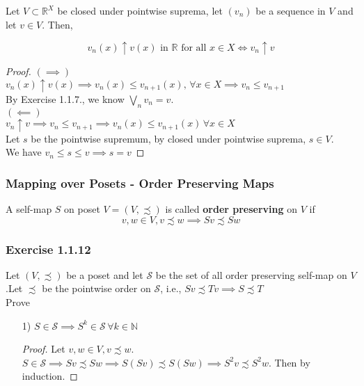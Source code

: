 \documentclass[11pt,xcolor={dvipsnames},hyperref={pdftex,pdfpagemode=UseNone,hidelinks,pdfdisplaydoctitle=true},usepdftitle=false]{beamer}
\begin{document}
\begin{frame}
\begin{lemma}
Let $V\subset \mathbb{R}^X$ be closed under pointwise suprema, let $(v_n)$ be a sequence in $V$ and let $v\in V$. Then,

$$
v_n(x)\uparrow v(x)\text{ in $\mathbb{R}$ for all $x\in X$} \iff v_n\uparrow v
$$
\end{lemma}
\begin{proof}
$(\implies)$\\
$v_n(x)\uparrow v(x)\implies v_n(x)\le v_{n+1}(x),\,\forall x\in X \implies v_n\le v_{n+1}$\\
By Exercise 1.1.7., we know $\bigvee_n v_n =v$.\\
$(\impliedby)$\\
$v_n\uparrow v\implies v_n\le v_{n+1} \implies v_n(x)\le v_{n+1}(x)\, \forall x\in X$\\
Let $s$ be the pointwise supremum, by closed under pointwise suprema, $s\in V$.\\
We have $v_n\le s\le v\implies s=v$ %
\end{proof}
\end{frame}


\begin{frame}
\frametitle{Mapping over Posets - Order Preserving Maps}
\begin{definition}
A self-map $S$ on poset $V = (V,\precsim)$ is called \textbf{order preserving} on $V$ if
$$
v,w\in V, v\precsim w\implies Sv\precsim Sw
$$
\end{definition}

\end{frame}

\begin{frame}
\frametitle{Exercise 1.1.12}
Let $(V,\precsim)$ be a poset and let $\mathcal{S}$ be the set of all order preserving self-map on $V$.Let $\precsim$ be the pointwise order on $\mathcal{S}$, i.e., $Sv\precsim Tv \implies S\precsim T$\\
Prove
\begin{enumerate}
\item[1)] $S\in \mathcal{S}\implies S^k\in \mathcal{S}\,\forall k\in\mathbb{N}$
\begin{proof}
Let $v,w\in V, v\precsim w$. 
$S\in\mathcal{S}\implies Sv\precsim Sw \implies S(Sv)\precsim S(Sw) \implies S^2 v\precsim S^2w$. Then by induction.
\end{proof}
\end{enumerate}
\end{frame}
\end{document}
